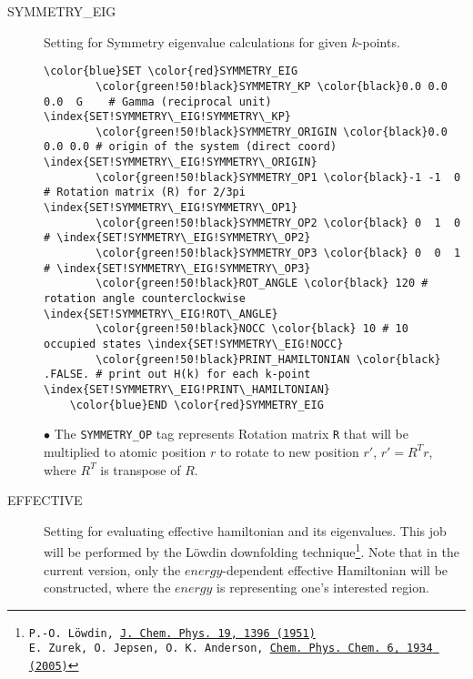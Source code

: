 \documentclass[a4paper,12pt]{scrartcl}
\makeatletter
\def\namedlabel#1#2{\begingroup
    #2%
    \def\@currentlabel{#2}%
    \phantomsection\label{#1}\endgroup
}
\makeatother
\begin{document}
\begin{description}
    \item[\namedlabel{tag:SYMMETRY}{SYMMETRY\_EIG}]  
		Setting for Symmetry eigenvalue calculations for given $k$-points.
 \begin{Verbatim}[commandchars=\\\{\},gobble=4, frame=single, framesep=2mm, 
	label= Parity check setup,
	labelposition=bottomline]
    \color{blue}SET \color{red}SYMMETRY_EIG
        \color{green!50!black}SYMMETRY_KP \color{black}0.0 0.0 0.0  G    # Gamma (reciprocal unit)  \index{SET!SYMMETRY\_EIG!SYMMETRY\_KP}
        \color{green!50!black}SYMMETRY_ORIGIN \color{black}0.0 0.0 0.0 # origin of the system (direct coord)  \index{SET!SYMMETRY\_EIG!SYMMETRY\_ORIGIN}
        \color{green!50!black}SYMMETRY_OP1 \color{black}-1 -1  0 # Rotation matrix (R) for 2/3pi  \index{SET!SYMMETRY\_EIG!SYMMETRY\_OP1}
        \color{green!50!black}SYMMETRY_OP2 \color{black} 0  1  0 # \index{SET!SYMMETRY\_EIG!SYMMETRY\_OP2}
        \color{green!50!black}SYMMETRY_OP3 \color{black} 0  0  1 # \index{SET!SYMMETRY\_EIG!SYMMETRY\_OP3}
        \color{green!50!black}ROT_ANGLE \color{black} 120 # rotation angle counterclockwise \index{SET!SYMMETRY\_EIG!ROT\_ANGLE}
        \color{green!50!black}NOCC \color{black} 10 # 10 occupied states \index{SET!SYMMETRY\_EIG!NOCC}
        \color{green!50!black}PRINT_HAMILTONIAN \color{black} .FALSE. # print out H(k) for each k-point  \index{SET!SYMMETRY\_EIG!PRINT\_HAMILTONIAN} 
    \color{blue}END \color{red}SYMMETRY_EIG
 \end{Verbatim}

 $\bullet$ The \texttt{SYMMETRY\_OP} tag represents Rotation matrix \texttt{R} that will be multiplied to atomic position \texttt{$r$}
 to rotate to new position \texttt{$r'$}, $r' = R^Tr$, where $R^T$ is transpose of $R$.
  
  
     \item[\namedlabel{tag:EFFECTIVE}{EFFECTIVE}] 
		Setting for evaluating effective hamiltonian and its eigenvalues. This job will be performed by the L\"owdin downfolding technique\footnote{
		\texttt{P.-O. L\"owdin, \href{https://aip.scitation.org/doi/abs/10.1063/1.1748067}{J. Chem. Phys. 19, 1396 (1951)}}\\
		\texttt{E. Zurek, O. Jepsen, O. K. Anderson, \href{https://onlinelibrary.wiley.com/doi/abs/10.1002/cphc.200500133}{Chem. Phys. Chem. 6, 1934 (2005)}}}. Note that in the current version, only the $energy$-dependent effective Hamiltonian will be constructed, where the $energy$ is representing one's interested region.
		


\end{description}
\end{document}
